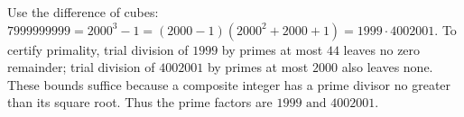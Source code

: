 Use the difference of cubes: $7999999999=2000^3-1=(2000-1)(2000^2+2000+1)=1999\cdot4002001$. To certify primality, trial division of $1999$ by primes at most $44$ leaves no zero remainder; trial division of $4002001$ by primes at most $2000$ also leaves none. These bounds suffice because a composite integer has a prime divisor no greater than its square root. Thus the prime factors are $\boxed{1999\text{ and }4002001}$.
